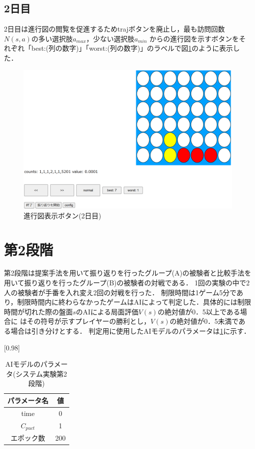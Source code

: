 \subsection{2日目}
2日目は進行図の閲覧を促進するためtrajボタンを廃止し，最も訪問回数$N(s,a)$の多い選択肢$a_{max}$，少ない選択肢$a_{min}$
からの進行図を示すボタンをそれぞれ「best:(列の数字)」「worst:(列の数字)」のラベルで図\ref{fig:best-worst}のように表示した．
\begin{figure}[t]
	\centering
	\includegraphics[width=\linewidth]{./figure/best-worst.png}
	\caption{進行図表示ボタン(2日目)}
	\label{fig:best-worst}
\end{figure}
\section{第2段階}
第2段階は提案手法を用いて振り返りを行ったグループ(A)の被験者と比較手法を用いて振り返りを行ったグループ(B)の被験者の対戦である．
1回の実験の中で2人の被験者が手番を入れ変え2回の対戦を行った．
制限時間は1ゲーム5分であり，制限時間内に終わらなかったゲームはAIによって判定した．具体的には制限時間が切れた際の盤面$s$のAIによる局面評価$V(s)$の絶対値が0．5以上である場合に
はその符号が示すプレイヤーの勝利とし，$V(s)$の絶対値が0．5未満である場合は引き分けとする．
判定用に使用したAIモデルのパラメータは\ref{table:param-judge}に示す．
\begin{table}[H]
	\caption{AIモデルのパラメータ(システム実験第2段階)}
    \label{table:param-judge}
	\centering
	\scalebox{0.98}[0.98]{
		\begin{tabular}{c|c}
			パラメータ名 & 値 \\ \hline
			time    & 0\\ 
			$C_{puct}$    & 1 \\
            エポック数 & 200 \\
		\end{tabular}
	}
	
\end{table}


